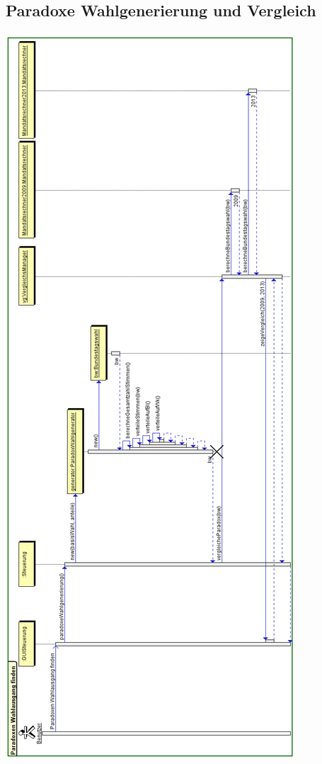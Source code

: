 \documentclass[12pt,a4paper,titlepage]{article}
\begin{document}
\subsection{Paradoxe Wahlgenerierung und Vergleich}
\includegraphics[scale=0.75]{paradoxeWahlgenerierung+Vergleich-Sequenzdiagramm.png} 
\end{document}
